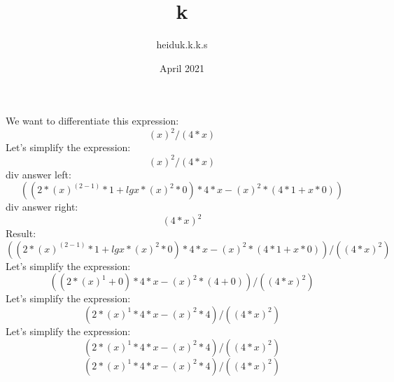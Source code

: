 \documentclass{article}
\title{k}
\author{heiduk.k.k.s }
\date{April 2021}
\begin{document}
\maketitle
\centering
We want to differentiate this expression:
$$ (x)^{2}/(4*x)$$
\centering
Let's simplify the expression:
$$ (x)^{2}/(4*x)$$
div answer left:  $$ ((2*(x)^{(2-1)}*1+lgx*(x)^{2}*0)*4*x-(x)^{2}*(4*1+x*0))$$
div answer right:  $$ (4*x)^{2}$$
\centering
Result:
$$ ((2*(x)^{(2-1)}*1+lgx*(x)^{2}*0)*4*x-(x)^{2}*(4*1+x*0))/((4*x)^{2})$$
\centering
Let's simplify the expression:
$$ ((2*(x)^{1}+0)*4*x-(x)^{2}*(4+0))/((4*x)^{2})$$
\centering
Let's simplify the expression:
$$ (2*(x)^{1}*4*x-(x)^{2}*4)/((4*x)^{2})$$
\centering
Let's simplify the expression:
$$ (2*(x)^{1}*4*x-(x)^{2}*4)/((4*x)^{2})$$
$$ (2*(x)^{1}*4*x-(x)^{2}*4)/((4*x)^{2})$$
\end{document}
